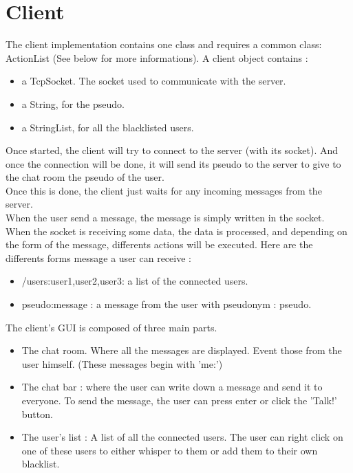 \documentclass[12pt]{report}
\begin{document}
\section{Client}
The client implementation contains one class and requires a common class: ActionList (See below for more informations). 
A client object contains :
\begin{itemize}
	\item a TcpSocket. The socket used to communicate with the server.
	\item a String, for the pseudo.
	\item a StringList, for all the blacklisted users.
\end{itemize}
Once started, the client will try to connect to the server (with its socket). And once the connection will be done, it will send its pseudo to the server to give to the chat room the pseudo of the user.\\
Once this is done, the client just waits for any incoming messages from the server.\\
When the user send a message, the message is simply written in the socket.
When the socket is receiving some data, the data is processed, and depending on the form of the message, differents actions will be executed.
Here are the differents forms message a user can receive :
\begin{itemize}
	\item /users:user1,user2,user3: a list of the connected users.
	\item pseudo:message : a message from the user with pseudonym : pseudo.
\end{itemize}
The client's GUI is composed of three main parts.
\begin{itemize}
	\item The chat room. Where all the messages are displayed. Event those from the user himself. (These messages begin with 'me:')
	\item The chat bar : where the user can write down a message and send it to everyone. To send the message, the user can press enter or click the 'Talk!' button.
	\item The user's list : A list of all the connected users. The user can right click on one of these users to either whisper to them or add them to their own blacklist.
\end{itemize}
\end{document}
